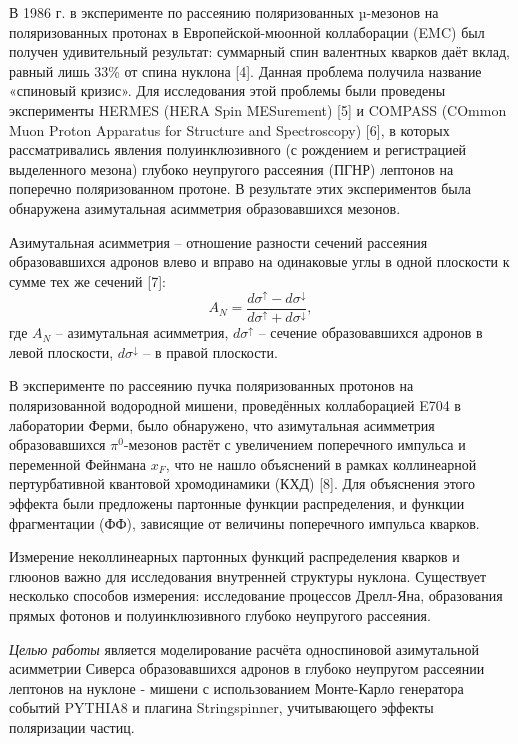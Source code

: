 \documentclass{extreport}
\begin{document}
В 1986 г. в эксперименте по рассеянию поляризованных µ-мезонов на поляризованных протонах в Европейской-мюонной коллаборации (EMC) был получен удивительный результат: суммарный спин валентных кварков даёт вклад, равный лишь 33\% от спина нуклона [4]. Данная проблема получила название «спиновый кризис». Для исследования этой проблемы были проведены эксперименты HERMES (HERA Spin MESurement) [5] и COMPASS (COmmon Muon Proton Apparatus for Structure and Spectroscopy) [6], в которых рассматривались явления полуинклюзивного (с рождением и регистрацией выделенного мезона) глубоко неупругого рассеяния (ПГНР) лептонов на поперечно поляризованном протоне. В результате этих экспериментов была обнаружена азимутальная асимметрия образовавшихся мезонов.


Азимутальная асимметрия – отношение разности сечений рассеяния образовавшихся адронов влево и вправо на одинаковые углы в одной плоскости к сумме тех же сечений [7]:
\begin{equation}
    A_N =\frac{d\sigma^\uparrow -d\sigma^\downarrow }{d\sigma^\uparrow +d\sigma^\downarrow },
\end{equation} 
где $A_N$ -- азимутальная асимметрия, $d\sigma^\uparrow$  – сечение образовавшихся адронов в левой плоскости, $d\sigma^\downarrow$  – в правой плоскости.


 В эксперименте по рассеянию пучка поляризованных протонов на поляризованной водородной мишени, проведённых коллаборацией E704 в лаборатории Ферми, было обнаружено, что азимутальная асимметрия образовавшихся $\pi^0$-мезонов растёт с увеличением поперечного импульса и переменной Фейнмана $x_F$, что не нашло объяснений в рамках коллинеарной пертурбативной квантовой хромодинамики (КХД) [8]. Для объяснения этого эффекта были предложены партонные функции распределения, и функции фрагментации (ФФ), зависящие от величины поперечного импульса кварков.

 
 Измерение неколлинеарных партонных функций распределения кварков и глюонов важно для исследования внутренней структуры нуклона. Существует несколько способов измерения: исследование процессов Дрелл-Яна, образования прямых фотонов и полуинклюзивного глубоко неупругого рассеяния. 

\textit{Целью работы} является моделирование расчёта односпиновой азимутальной асимметрии Сиверса образовавшихся адронов в глубоко неупругом рассеянии лептонов на нуклоне - мишени с использованием Монте-Карло генератора событий PYTHIA8 и плагина Stringspinner, учитывающего эффекты поляризации частиц. 
\end{document}
